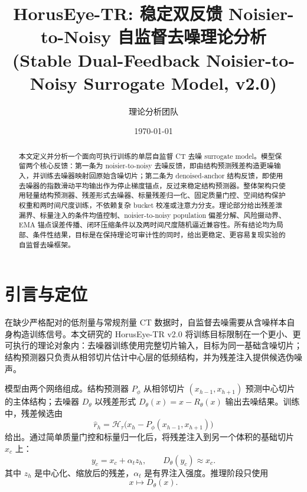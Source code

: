 \documentclass[11pt,a4paper,UTF8,fontset=fandol]{ctexart}
\theoremstyle{definition}
\newcommand{\cH}{\mathcal{H}}
\begin{document}
\title{HorusEye-TR: 稳定双反馈 Noisier-to-Noisy 自监督去噪理论分析\\(Stable Dual-Feedback Noisier-to-Noisy Surrogate Model, v2.0)}
\author{理论分析团队}
\date{\today}
\maketitle

\begin{abstract}
本文定义并分析一个面向可执行训练的单层自监督 CT 去噪 surrogate model。模型保留两个核心反馈：第一条为 noisier-to-noisy 去噪反馈，即由结构预测残差构造更噪输入，并训练去噪器映射回原始含噪切片；第二条为 denoised-anchor 结构反馈，即使用去噪器的指数滑动平均输出作为停止梯度锚点，反过来稳定结构预测器。整体架构只使用轻量结构预测器、残差形式去噪器、标量残差归一化、固定质量门控、空间结构保护权重和两时间尺度训练，不依赖复杂 bucket 校准或注意力分支。理论部分给出残差泄漏界、标量注入的条件均值控制、noisier-to-noisy population 偏差分解、风险摄动界、EMA 锚点误差传播、闭环压缩条件以及两时间尺度随机逼近兼容性。所有结论均为局部、条件性结果，目标是在保持理论可审计性的同时，给出更稳定、更容易复现实验的自监督去噪框架。
\end{abstract}

\tableofcontents
\newpage

\section{引言与定位}

在缺少严格配对的低剂量与常规剂量 CT 数据时，自监督去噪需要从含噪样本自身构造训练信号。本文研究的 HorusEye-TR v2.0 将训练目标限制在一个更小、更可执行的理论对象内：去噪器训练使用完整切片输入，目标为同一基础含噪切片；结构预测器只负责从相邻切片估计中心层的低频结构，并为残差注入提供候选伪噪声。

模型由两个网络组成。结构预测器 $P_\phi$ 从相邻切片 $(x_{h-1},x_{h+1})$ 预测中心切片的主体结构；去噪器 $D_\theta$ 以残差形式 $D_\theta(x)=x-R_\theta(x)$ 输出去噪结果。训练中，残差候选由
\begin{equation}
    \hat r_h=\cH_\tau\big(x_h-P_\phi(x_{h-1},x_{h+1})\big)
\end{equation}
给出。通过简单质量门控和标量归一化后，将残差注入到另一个体积的基础切片 $x_c$ 上：
\begin{equation}
    y_c=x_c+\alpha_t z_h,
    \qquad
    D_\theta(y_c)\approx x_c.
\end{equation}
其中 $z_h$ 是中心化、缩放后的残差，$\alpha_t$ 是有界注入强度。推理阶段只使用
\begin{equation}
    x\longmapsto D_\theta(x).
\end{equation}
\end{document}

